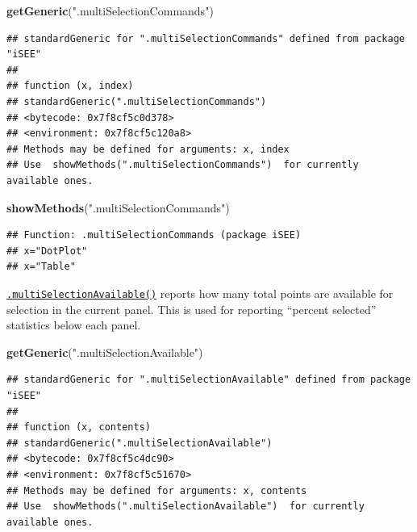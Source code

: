\documentclass[
]{book}
\newenvironment{Shaded}{\begin{snugshade}}{\end{snugshade}}
\newcommand{\KeywordTok}[1]{\textcolor[rgb]{0.13,0.29,0.53}{\textbf{#1}}}
\newcommand{\NormalTok}[1]{#1}
\newcommand{\StringTok}[1]{\textcolor[rgb]{0.31,0.60,0.02}{#1}}
\begin{document}
\begin{Shaded}
\begin{Highlighting}[]
\KeywordTok{getGeneric}\NormalTok{(}\StringTok{".multiSelectionCommands"}\NormalTok{)}
\end{Highlighting}
\end{Shaded}

\begin{verbatim}
## standardGeneric for ".multiSelectionCommands" defined from package "iSEE"
## 
## function (x, index) 
## standardGeneric(".multiSelectionCommands")
## <bytecode: 0x7f8cf5c0d378>
## <environment: 0x7f8cf5c120a8>
## Methods may be defined for arguments: x, index
## Use  showMethods(".multiSelectionCommands")  for currently available ones.
\end{verbatim}

\begin{Shaded}
\begin{Highlighting}[]
\KeywordTok{showMethods}\NormalTok{(}\StringTok{".multiSelectionCommands"}\NormalTok{)}
\end{Highlighting}
\end{Shaded}

\begin{verbatim}
## Function: .multiSelectionCommands (package iSEE)
## x="DotPlot"
## x="Table"
\end{verbatim}

\href{https://isee.github.io/iSEE/reference/multi-select-generics.html}{\texttt{.multiSelectionAvailable()}} reports how many total points are available for selection in the current panel.
This is used for reporting ``percent selected'' statistics below each panel.

\begin{Shaded}
\begin{Highlighting}[]
\KeywordTok{getGeneric}\NormalTok{(}\StringTok{".multiSelectionAvailable"}\NormalTok{)}
\end{Highlighting}
\end{Shaded}

\begin{verbatim}
## standardGeneric for ".multiSelectionAvailable" defined from package "iSEE"
## 
## function (x, contents) 
## standardGeneric(".multiSelectionAvailable")
## <bytecode: 0x7f8cf5c4dc90>
## <environment: 0x7f8cf5c51670>
## Methods may be defined for arguments: x, contents
## Use  showMethods(".multiSelectionAvailable")  for currently available ones.
\end{verbatim}
\end{document}
